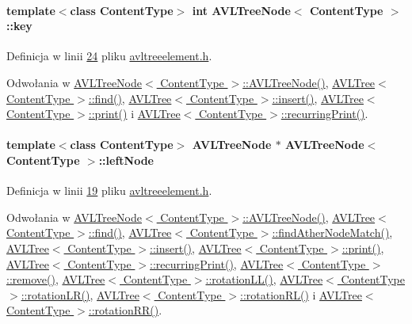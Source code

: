\hypertarget{class_a_v_l_tree_node_a717c2f6c33504a065570802e95189a57}{
\paragraph[{key}]{\setlength{\rightskip}{0pt plus 5cm}template$<$class Content\-Type$>$ int {\bf A\-V\-L\-Tree\-Node}$<$ Content\-Type $>$\-::key}}\label{class_a_v_l_tree_node_a717c2f6c33504a065570802e95189a57}


Definicja w linii \hyperlink{avltreeelement_8h_source_l00024}{24} pliku \hyperlink{avltreeelement_8h_source}{avltreeelement.\-h}.



Odwołania w \hyperlink{avltreeelement_8h_source_l00027}{A\-V\-L\-Tree\-Node$<$ Content\-Type $>$\-::\-A\-V\-L\-Tree\-Node()}, \hyperlink{avltree_8h_source_l00250}{A\-V\-L\-Tree$<$ Content\-Type $>$\-::find()}, \hyperlink{avltree_8h_source_l00049}{A\-V\-L\-Tree$<$ Content\-Type $>$\-::insert()}, \hyperlink{avltree_8h_source_l00389}{A\-V\-L\-Tree$<$ Content\-Type $>$\-::print()} i \hyperlink{avltree_8h_source_l00382}{A\-V\-L\-Tree$<$ Content\-Type $>$\-::recurring\-Print()}.

\hypertarget{class_a_v_l_tree_node_afc53d4774f375c23795c9eb598f4d7cd}{
\paragraph[{left\-Node}]{\setlength{\rightskip}{0pt plus 5cm}template$<$class Content\-Type$>$ {\bf A\-V\-L\-Tree\-Node} $\ast$ {\bf A\-V\-L\-Tree\-Node}$<$ Content\-Type $>$\-::left\-Node}}\label{class_a_v_l_tree_node_afc53d4774f375c23795c9eb598f4d7cd}


Definicja w linii \hyperlink{avltreeelement_8h_source_l00019}{19} pliku \hyperlink{avltreeelement_8h_source}{avltreeelement.\-h}.



Odwołania w \hyperlink{avltreeelement_8h_source_l00027}{A\-V\-L\-Tree\-Node$<$ Content\-Type $>$\-::\-A\-V\-L\-Tree\-Node()}, \hyperlink{avltree_8h_source_l00250}{A\-V\-L\-Tree$<$ Content\-Type $>$\-::find()}, \hyperlink{avltree_8h_source_l00271}{A\-V\-L\-Tree$<$ Content\-Type $>$\-::find\-Ather\-Node\-Match()}, \hyperlink{avltree_8h_source_l00049}{A\-V\-L\-Tree$<$ Content\-Type $>$\-::insert()}, \hyperlink{avltree_8h_source_l00389}{A\-V\-L\-Tree$<$ Content\-Type $>$\-::print()}, \hyperlink{avltree_8h_source_l00382}{A\-V\-L\-Tree$<$ Content\-Type $>$\-::recurring\-Print()}, \hyperlink{avltree_8h_source_l00289}{A\-V\-L\-Tree$<$ Content\-Type $>$\-::remove()}, \hyperlink{avltree_8h_source_l00166}{A\-V\-L\-Tree$<$ Content\-Type $>$\-::rotation\-L\-L()}, \hyperlink{avltree_8h_source_l00222}{A\-V\-L\-Tree$<$ Content\-Type $>$\-::rotation\-L\-R()}, \hyperlink{avltree_8h_source_l00195}{A\-V\-L\-Tree$<$ Content\-Type $>$\-::rotation\-R\-L()} i \hyperlink{avltree_8h_source_l00137}{A\-V\-L\-Tree$<$ Content\-Type $>$\-::rotation\-R\-R()}.

